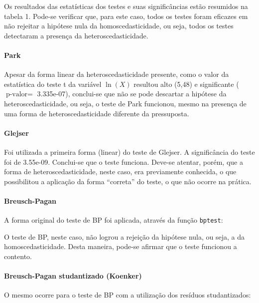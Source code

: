\documentclass[a4paper, 12pt]{article}
\let\oldparagraph\paragraph
\renewcommand{\paragraph}[1]{\oldparagraph{#1}\mbox{}}
\let\code=\texttt
\begin{document}
Os resultados das estatísticas dos testes e suas significâncias estão
resumidos na tabela 1. Pode-se verificar que, para este caso, todos os
testes foram eficazes em não rejeitar a hipótese nula da
homoscedasticidade, ou seja, todos os testes detectaram a presença da
heteroscedasticidade.

\hypertarget{park}{%
\paragraph{Park}\label{park}}

Apesar da forma linear da heteroscedasticidade presente, como o valor da
estatística do teste t da variável \(\ln(X)\) resultou alto (5,48) e
significante (\(\text{p-valor} =\) 3.335e-07), conclui-se que não se
pode descartar a hipótese da heteroscedasticidade, ou seja, o teste de
Park funcionou, mesmo na presença de uma forma de heteroscedasticidade
diferente da pressuposta.

\hypertarget{glejser}{%
\paragraph{Glejser}\label{glejser}}

Foi utilizada a primeira forma (linear) do teste de Glejser. A
significância do teste foi de 3.55e-09. Conclui-se que o teste funciona.
Deve-se atentar, porém, que a forma de heteroscedasticidade, neste caso,
era previamente conhecida, o que possibilitou a aplicação da forma
``correta'' do teste, o que não ocorre na prática.

\hypertarget{breusch-pagan}{%
\paragraph{Breusch-Pagan}\label{breusch-pagan}}

A forma original do teste de BP foi aplicada, através da função
\code{bptest}:

O teste de BP, neste caso, não logrou a rejeição da hipótese nula, ou
seja, a da homoscedasticidade. Desta maneira, pode-se afirmar que o
teste funcionou a contento.

\hypertarget{breusch-pagan-studantizado-koenker}{%
\paragraph{Breusch-Pagan studantizado
(Koenker)}\label{breusch-pagan-studantizado-koenker}}

O mesmo ocorre para o teste de BP com a utilização dos resíduos
studantizados:
\end{document}
